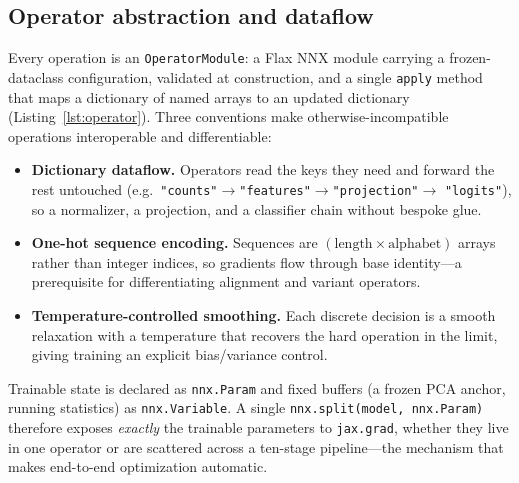 \documentclass[10pt,twocolumn]{article}
\begin{document}
\subsection{Operator abstraction and dataflow}

Every operation is an \texttt{OperatorModule}: a Flax NNX module carrying a frozen-dataclass
configuration, validated at construction, and a single \texttt{apply} method that maps a
dictionary of named arrays to an updated dictionary (Listing~\ref{lst:operator}). Three
conventions make otherwise-incompatible operations interoperable and differentiable:
\begin{itemize}\itemsep1pt
\item \textbf{Dictionary dataflow.} Operators read the keys they need and forward the rest
untouched (e.g.\ \texttt{"counts"}$\to$\texttt{"features"}$\to$\texttt{"projection"}$\to$%
\texttt{"logits"}), so a normalizer, a projection, and a classifier chain without bespoke
glue.
\item \textbf{One-hot sequence encoding.} Sequences are $(\text{length}\times\text{alphabet})$
arrays rather than integer indices, so gradients flow through base identity---a prerequisite
for differentiating alignment and variant operators.
\item \textbf{Temperature-controlled smoothing.} Each discrete decision is a smooth
relaxation with a temperature that recovers the hard operation in the limit, giving training
an explicit bias/variance control.
\end{itemize}
Trainable state is declared as \texttt{nnx.Param} and fixed buffers (a frozen PCA anchor,
running statistics) as \texttt{nnx.Variable}. A single \texttt{nnx.split(model,\,nnx.Param)}
therefore exposes \emph{exactly} the trainable parameters to \texttt{jax.grad}, whether they
live in one operator or are scattered across a ten-stage pipeline---the mechanism that makes
end-to-end optimization automatic.
\end{document}
